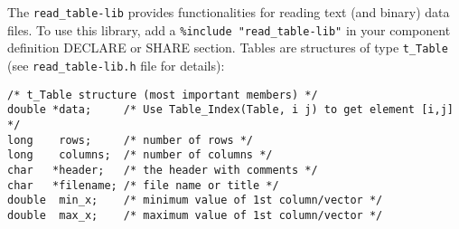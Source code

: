 The \verb+read_table-lib+ provides functionalities for reading text
  (and binary) data files. To use this library,
  add a \verb+%include "read_table-lib"+ in your component definition
  DECLARE or SHARE section. Tables are structures of type \verb+t_Table+
  (see \verb+read_table-lib.h+ file for details):
\begin{lstlisting}
/* t_Table structure (most important members) */
double *data;     /* Use Table_Index(Table, i j) to get element [i,j] */
long    rows;     /* number of rows */
long    columns;  /* number of columns */
char   *header;   /* the header with comments */
char   *filename; /* file name or title */
double  min_x;    /* minimum value of 1st column/vector */
double  max_x;    /* maximum value of 1st column/vector */
\end{lstlisting}

